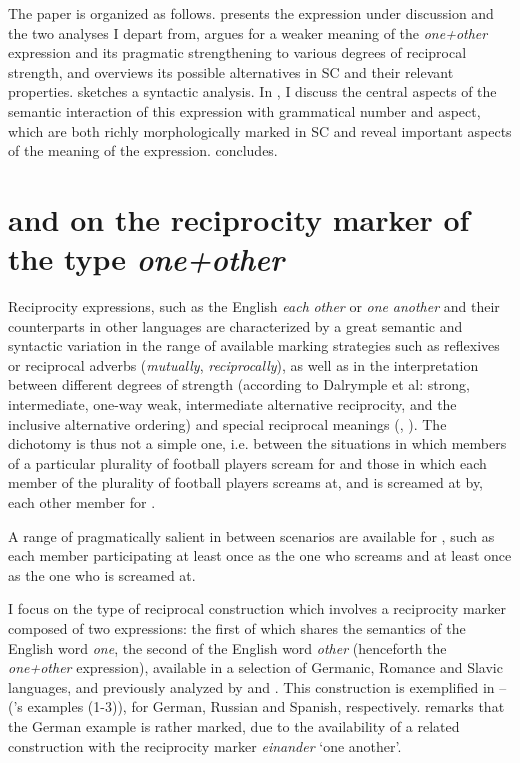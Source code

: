 \documentclass[output=paper,colorlinks,citecolor=brown]{langscibook}
\begin{document}
The paper is organized as follows.  presents the expression under discussion and the two analyses I depart from,  argues for a weaker meaning of the \textit{one+other} expression and its pragmatic strengthening to various degrees of reciprocal strength, and  overviews its possible alternatives in SC and their relevant properties.  sketches a syntactic analysis. In , I discuss the central aspects of the semantic interaction of this expression with grammatical number and aspect, which are both richly morphologically marked in SC and reveal important aspects of the meaning of the expression.  concludes.


\section{\citet{v10} and \citet{z14} on the reciprocity marker of the type \textit{one+other}}\label{sec:2}

Reciprocity expressions, such as the English \textit{each} \textit{other} or \textit{one} \textit{another} and their counterparts in other languages are characterized by a great semantic and syntactic variation in the range of available marking strategies such as reflexives or reciprocal adverbs (\textit{mutually}, \textit{reciprocally}), as well as in the interpretation between different degrees of strength (according to Dalrymple et al: strong, intermediate, one-way weak, intermediate alternative reciprocity, and the inclusive alternative ordering) and special reciprocal meanings (\citealt{dkmp94}, \citealt{n07}). The dichotomy is thus not a simple one, i.e. between the situations in which members of a particular plurality of football players scream for  and those in which each member of the plurality of football players screams at, and is screamed at by, each other member for .

\ea\label{ex:Football}
\label{ex:Football-a}
\label{ex:Football-b}
\z\z

\noindent A range of pragmatically salient in between scenarios are available for , such as each member participating at least once as the one who screams and at least once as the one who is screamed at.

I focus on the type of reciprocal construction which involves a reciprocity marker composed of two expressions: the first of which shares the semantics of the English word \textit{one}, the second of the English word \textit{other} (henceforth the \textit{one+other} expression), available in a selection of Germanic, Romance and Slavic languages, and previously analyzed by \citet{v10} and \citet{z14}. This construction is exemplified in -- (\citeauthor{z14}'s examples (1-3)), for German, Russian and Spanish, respectively. \citeauthor{z14} remarks that the German example is rather marked, due to the availability of a related construction with the reciprocity marker \textit{einander} `one another'.
\end{document}
